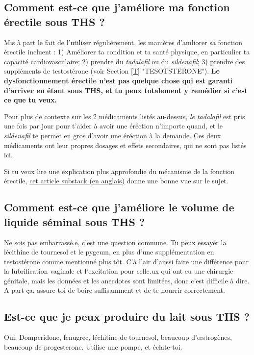 \documentclass{article}
\begin{document}
\subsection{Comment est-ce que j'améliore ma fonction érectile sous THS ?}\label{11-20}

Mis à part le fait de l'utiliser régulièrement, les manières d'amliorer sa fonction érectile incluent : 1) Améliorer ta condition et ta santé physique, en particulier ta capacité cardiovasculaire; 2) prendre du \textit{tadalafil} ou du \textit{sildenafil}; 3) prendre des suppléments de testostérone (voir Section \ref{T} "TESOTSTERONE"). \textbf{Le dysfonctionnement érectile n'est pas quelque chose qui est garanti d'arriver en étant sous THS, et tu peux totalement y remédier si c'est ce que tu veux.} 

Pour plus de contexte sur les 2 médicaments listés au-dessus, \textit{le tadalafil} est pris une fois par jour pour t'aider à avoir une éréction n'importe quand, et le \textit{sildenafil} te permet en gros d'avoir une éréction à la demande. Ces deux médicaments ont leur propres dosages et effets secondaires, qui ne sont pas listés ici.  

Si tu veux lire une explication plus approfondie du mécanisme de la fonction érectile, \href{https://stainedglasswoman.substack.com/p/how-to-maintain-your-penis-function}{cet article substack (en anglais)} donne une bonne vue sur le sujet.

\subsection{Comment est-ce que j'améliore le volume de liquide séminal sous THS ?}

Ne sois pas embarrassé.e, c'est une question commune. Tu peux essayer la lécithine de tournesol et le pygeum, en plus d'une supplémentation en testostérone comme mentionné plus tôt. C'à l'air d'aussi faire une différence pour la lubrification vaginale et l'excitation pour celle.ux qui ont eu une chirurgie génitale, mais les données et les anecdotes sont limitées, donc c'est difficile à dire. A part ça, assure-toi de boire suffisamment et de te nourrir correctement.

\subsection{Est-ce que je peux produire du lait sous THS ?}

Oui. Domperidone, fenugrec, léchitine de tournesol, beaucoup d'œstrogènes, beaucoup de progesterone. Utilise une pompe, et éclate-toi.
\end{document}
